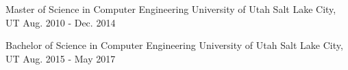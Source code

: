 


\begin{cventries}


\cventry
{Master of Science in Computer Engineering}
{University of Utah}
{Salt Lake City, UT}
{Aug. 2010 - Dec. 2014}
{}


\cventry
{Bachelor of Science in Computer Engineering}
{University of Utah}
{Salt Lake City, UT}
{Aug. 2015 - May 2017}
{}


\end{cventries}